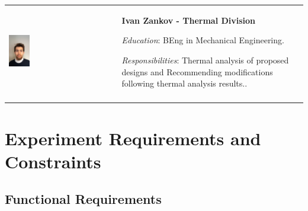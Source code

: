 \documentclass[a4paper,12pt,twoside]{article}
\begin{document}
\begin{longtable}[]{m{} m{}}
\includegraphics[width=0.2\textwidth]{1-introduction/img/ivan-zankov.jpg} & \textbf{Ivan Zankov - Thermal Division}

\smallskip
\textit{Education}: BEng in Mechanical Engineering.

\smallskip
\textit{Responsibilities}: Thermal analysis of proposed designs and Recommending modifications following thermal analysis results..                                                          

\\
\label{tab:people}
\end{longtable}
\raggedbottom

\pagebreak
\section{Experiment Requirements and Constraints}

\subsection{Functional Requirements}
\end{document}
